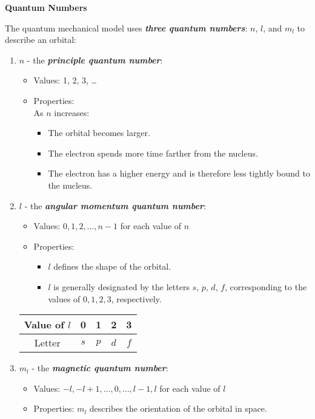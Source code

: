 \documentclass[12pt, a4paper]{report}
\newcommand{\impt}[1]{\textbf{\textit{#1}}}
\newcommand{\hiii}{\item\textbf}
\newcommand{\tableBEGIN}[1]{\begin{center} \begin{tabular}{#1}}
\newcommand{\tableEND}{\end{tabular} \end{center}}
\begin{document}
        \hiii{Quantum Numbers}
            \par The quantum mechanical model uses \impt{three quantum numbers}: $n$, $l$,
            and $m_{l}$ to describe an orbital:
            \begin{enumerate}
                \item $n$ - the \impt{principle quantum number}:
                    \begin{itemize}
                        \item Values: 1, 2, 3, \ldots
                        \item Properties: \\ As $n$ increases:
                        \begin{itemize}
                            \item The orbital becomes larger.
                            \item The electron spends more time farther from the nucleus.
                            \item The electron has a higher energy and is therefore less tightly bound
                                to the nucleus.
                        \end{itemize}
                   \end{itemize}
                \item $l$ - the \impt{angular momentum quantum number}:
                    \begin{itemize}
                        \item Values: $0, 1, 2, \ldots, n - 1$ for each value of $n$
                        \item Properties:
                            \begin{itemize}
                                \item $l$ defines the shape of the orbital.
                                \item $l$ is generally designated by the letters $s$, $p$, $d$, $f$,
                                    corresponding to the values of $0, 1, 2, 3$, respectively.
                            \end{itemize}
                    \end{itemize}
                    \tableBEGIN{|c|c|c|c|c|}
                        \hline
                        Value of $l$ & 0 & 1 & 2 & 3 \\
                        \hline
                        Letter & $s$ & $p$ & $d$ & $f$ \\
                        \hline
                    \tableEND
                \item $m_{l}$ - the \impt{magnetic quantum number}:
                    \begin{itemize}
                        \item Values: $-l, -l + 1, \ldots, 0, \ldots, l - 1, l$ for each value of $l$
                        \item Properties: $m_{l}$ describes the orientation of the orbital in space.
                    \end{itemize}
            \end{enumerate}
\end{document}
